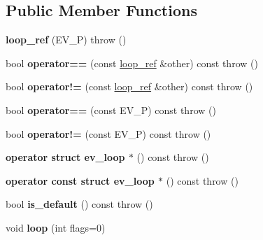 \subsection*{Public Member Functions}
\begin{DoxyCompactItemize}
\item 
\hypertarget{structev_1_1loop__ref_af8f35791dbfc13235d5da3261e0f221b}{}\label{structev_1_1loop__ref_af8f35791dbfc13235d5da3261e0f221b} 
{\bfseries loop\+\_\+ref} (E\+V\+\_\+P)  throw ()
\item 
\hypertarget{structev_1_1loop__ref_aead905548b6ac07d97654fa7d4a569c4}{}\label{structev_1_1loop__ref_aead905548b6ac07d97654fa7d4a569c4} 
bool {\bfseries operator==} (const \hyperlink{structev_1_1loop__ref}{loop\+\_\+ref} \&other) const  throw ()
\item 
\hypertarget{structev_1_1loop__ref_a441765d1f27280dcba684fab2654e15b}{}\label{structev_1_1loop__ref_a441765d1f27280dcba684fab2654e15b} 
bool {\bfseries operator!=} (const \hyperlink{structev_1_1loop__ref}{loop\+\_\+ref} \&other) const  throw ()
\item 
\hypertarget{structev_1_1loop__ref_a9957eca84f0bf44875cbcabf72ecd81e}{}\label{structev_1_1loop__ref_a9957eca84f0bf44875cbcabf72ecd81e} 
bool {\bfseries operator==} (const E\+V\+\_\+P) const  throw ()
\item 
\hypertarget{structev_1_1loop__ref_abd695290d3cd6324eba73824d213b05e}{}\label{structev_1_1loop__ref_abd695290d3cd6324eba73824d213b05e} 
bool {\bfseries operator!=} (const E\+V\+\_\+P) const  throw ()
\item 
\hypertarget{structev_1_1loop__ref_aaefad67b40311ad68544d604d484dcbb}{}\label{structev_1_1loop__ref_aaefad67b40311ad68544d604d484dcbb} 
{\bfseries operator struct ev\+\_\+loop $\ast$} () const  throw ()
\item 
\hypertarget{structev_1_1loop__ref_af0618b351074be5243c985fccb470896}{}\label{structev_1_1loop__ref_af0618b351074be5243c985fccb470896} 
{\bfseries operator const struct ev\+\_\+loop $\ast$} () const  throw ()
\item 
\hypertarget{structev_1_1loop__ref_ab803c7d23963803c24ae201abb862aed}{}\label{structev_1_1loop__ref_ab803c7d23963803c24ae201abb862aed} 
bool {\bfseries is\+\_\+default} () const  throw ()
\item 
\hypertarget{structev_1_1loop__ref_aac842842270f64dbbc2ce71b033e0be7}{}\label{structev_1_1loop__ref_aac842842270f64dbbc2ce71b033e0be7} 
void {\bfseries loop} (int flags=0)
\item 
\hypertarget{structev_1_1loop__ref_aec8590666ff6a3fe0a09c1ba86c5fd6a}{}\label{structev_1_1loop__ref_aec8590666ff6a3fe0a09c1ba86c5fd6a} 

\end{DoxyCompactItemize}
